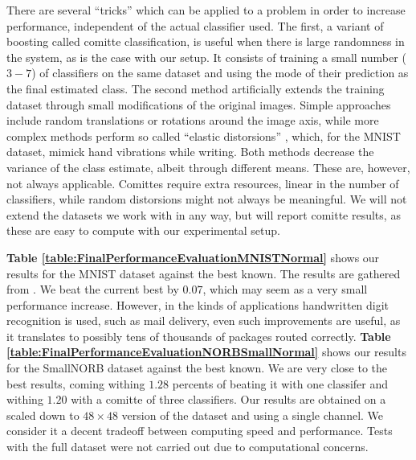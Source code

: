 \documentclass[12pt,a4paper,oneside,english]{UPBThesis}
\newcommand{\hctimes}[2]{{#1}\!\times\!{#2}}
\begin{document}
There are several ``tricks'' which can be applied to a problem in order to increase performance, independent of the actual classifier used. The first, a variant of boosting called comitte classification, is useful when there is large randomness in the system, as is the case with our setup. It consists of training a small number ($3-7$) of classifiers on the same dataset and using the mode of their prediction as the final estimated class. The second method artificially extends the training dataset through small modifications of the original images. Simple approaches include random translations or rotations around the image axis, while more complex methods perform so called ``elastic distorsions'' \cite{best-practices-cnn}, which, for the MNIST dataset, mimick hand vibrations while writing. Both methods decrease the variance of the class estimate, albeit through different means. These are, however, not always applicable. Comittes require extra resources, linear in the number of classifiers, while random distorsions might not always be meaningful. We will not extend the datasets we work with in any way, but will report comitte results, as these are easy to compute with our experimental setup. 

\textbf{Table \ref{table:FinalPerformanceEvaluationMNISTNormal}} shows our results for the MNIST dataset against the best known. The results are gathered from \cite{mnist-website}. We beat the current best by $0.07$, which may seem as a very small performance increase. However, in the kinds of applications handwritten digit recognition is used, such as mail delivery, even such improvements are useful, as it translates to possibly tens of thousands of packages routed correctly. \textbf{Table \ref{table:FinalPerformanceEvaluationNORBSmallNormal}} shows our results for the SmallNORB dataset against the best known. We are very close to the best results, coming withing $1.28$ percents of beating it with one classifer and withing $1.20$ with a comitte of three classifiers. Our results are obtained on a scaled down to $\hctimes{48}{48}$ version of the dataset and using a single channel. We consider it a decent tradeoff between computing speed and performance. Tests with the full dataset were not carried out due to computational concerns.
\end{document}
